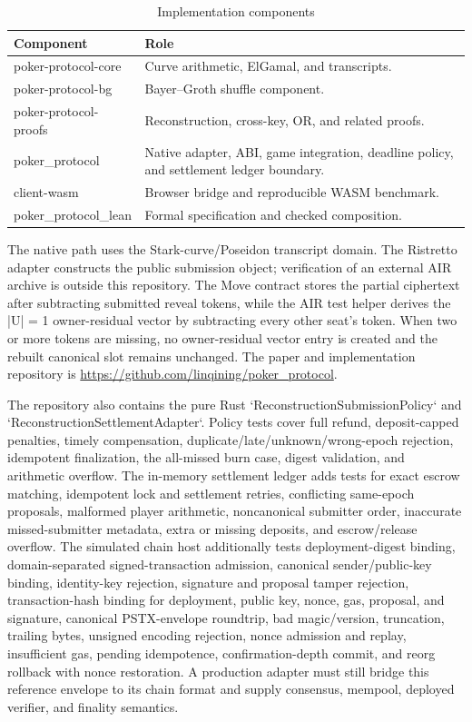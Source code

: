 \documentclass[11pt]{article}
\begin{document}
\begin{table}[htbp]
\centering
\small
\caption{Implementation components}
\begin{tabularx}{\textwidth}{>{\RaggedRight}X >{\RaggedRight}X}
\toprule
Component & Role \\
\midrule
poker-protocol-core & Curve arithmetic, ElGamal, and transcripts. \\
poker-protocol-bg & Bayer–Groth shuffle component. \\
poker-protocol-proofs & Reconstruction, cross-key, OR, and related proofs. \\
poker\_protocol & Native adapter, ABI, game integration, deadline policy, and settlement ledger boundary. \\
client-wasm & Browser bridge and reproducible WASM benchmark. \\
poker\_protocol\_lean & Formal specification and checked composition. \\
\bottomrule
\end{tabularx}
\end{table}

The native path uses the Stark-curve/Poseidon transcript domain. The Ristretto adapter constructs the public submission object; verification of an external AIR archive is outside this repository. The Move contract stores the partial ciphertext after subtracting submitted reveal tokens, while the AIR test helper derives the |U| = 1 owner-residual vector by subtracting every other seat’s token. When two or more tokens are missing, no owner-residual vector entry is created and the rebuilt canonical slot remains unchanged. The paper and implementation repository is \url{https://github.com/linqining/poker_protocol}.

The repository also contains the pure Rust `ReconstructionSubmissionPolicy` and `ReconstructionSettlementAdapter`. Policy tests cover full refund, deposit-capped penalties, timely compensation, duplicate/late/unknown/wrong-epoch rejection, idempotent finalization, the all-missed burn case, digest validation, and arithmetic overflow. The in-memory settlement ledger adds tests for exact escrow matching, idempotent lock and settlement retries, conflicting same-epoch proposals, malformed player arithmetic, noncanonical submitter order, inaccurate missed-submitter metadata, extra or missing deposits, and escrow/release overflow. The simulated chain host additionally tests deployment-digest binding, domain-separated signed-transaction admission, canonical sender/public-key binding, identity-key rejection, signature and proposal tamper rejection, transaction-hash binding for deployment, public key, nonce, gas, proposal, and signature, canonical PSTX-envelope roundtrip, bad magic/version, truncation, trailing bytes, unsigned encoding rejection, nonce admission and replay, insufficient gas, pending idempotence, confirmation-depth commit, and reorg rollback with nonce restoration. A production adapter must still bridge this reference envelope to its chain format and supply consensus, mempool, deployed verifier, and finality semantics.
\end{document}
